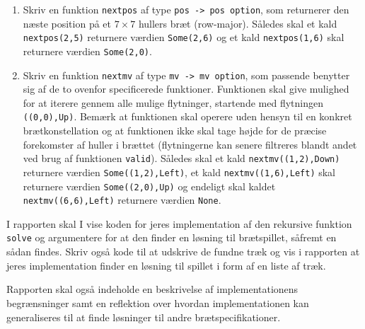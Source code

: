\begin{description}
\begin{enumerate}
\item Skriv en funktion \lstinline{nextpos} af type \lstinline{pos -> pos option}, som returnerer den næste position på et $7 \times 7$ hullers bræt (row-major). Således skal et kald \lstinline{nextpos(2,5)} returnere værdien \lstinline{Some(2,6)} og et kald \lstinline{nextpos(1,6)} skal returnere værdien \lstinline{Some(2,0)}.

\item Skriv en funktion \lstinline{nextmv} af type \lstinline{mv -> mv option}, som passende benytter sig af de to ovenfor specificerede funktioner. Funktionen skal give mulighed for at iterere gennem alle mulige flytninger, startende med flytningen \lstinline{((0,0),Up)}. Bemærk at funktionen skal operere uden hensyn til en konkret brætkonstellation og at funktionen ikke skal tage højde for de præcise forekomster af huller i brættet (flytningerne kan senere filtreres blandt andet ved brug af funktionen \lstinline{valid}).
%
Således skal et kald \lstinline{nextmv((1,2),Down)} returnere værdien \lstinline{Some((1,2),Left)}, et kald \lstinline{nextmv((1,6),Left)} skal returnere værdien \lstinline{Some((2,0),Up)} og endeligt skal kaldet \lstinline{nextmv((6,6),Left)} returnere værdien \lstinline{None}.
\end{enumerate}
\end{description}

I rapporten skal I vise koden for jeres implementation af den rekursive funktion \lstinline{solve} og argumentere for at den finder en løsning til brætspillet, såfremt en sådan findes. Skriv også kode til at udskrive de fundne træk og vis i rapporten at jeres implementation finder en løsning til spillet i form af en liste af træk.

Rapporten skal også indeholde en beskrivelse af implementationens begrænsninger samt en reflektion over hvordan implementationen kan generaliseres til at finde løsninger til andre brætspecifikationer.
